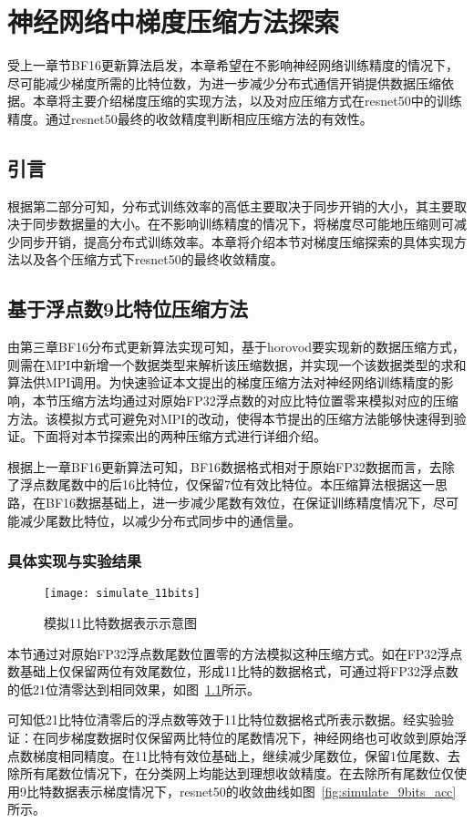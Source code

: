 \chapter{神经网络中梯度压缩方法探索}
受上一章节BF16更新算法启发，本章希望在不影响神经网络训练精度的情况下，尽可能减少梯度所需的比特位数，为进一步减少分布式通信开销提供数据压缩依据。本章将主要介绍梯度压缩的实现方法，以及对应压缩方式在resnet50中的训练精度。通过resnet50最终的收敛精度判断相应压缩方法的有效性。
\section{引言}
根据第二部分可知，分布式训练效率的高低主要取决于同步开销的大小，其主要取决于同步数据量的大小。在不影响训练精度的情况下，将梯度尽可能地压缩则可减少同步开销，提高分布式训练效率。本章将介绍本节对梯度压缩探索的具体实现方法以及各个压缩方式下resnet50的最终收敛精度。
\section{基于浮点数9比特位压缩方法}
由第三章BF16分布式更新算法实现可知，基于horovod要实现新的数据压缩方式，则需在MPI中新增一个数据类型来解析该压缩数据，并实现一个该数据类型的求和算法供MPI调用。为快速验证本文提出的梯度压缩方法对神经网络训练精度的影响，本节压缩方法均通过对原始FP32浮点数的对应比特位置零来模拟对应的压缩方法。该模拟方式可避免对MPI的改动，使得本节提出的压缩方法能够快速得到验证。下面将对本节探索出的两种压缩方式进行详细介绍。

根据上一章BF16更新算法可知，BF16数据格式相对于原始FP32数据而言，去除了浮点数尾数中的后16比特位，仅保留7位有效比特位。本压缩算法根据这一思路，在BF16数据基础上，进一步减少尾数有效位，在保证训练精度情况下，尽可能减少尾数比特位，以减少分布式同步中的通信量。

\subsection{具体实现与实验结果}
\begin{figure}[htp]
\centering
\texttt{[image: simulate\_11bits]}
\caption{模拟11比特数据表示示意图}
\label{fig:simulate_11bits}
\end{figure}
本节通过对原始FP32浮点数尾数位置零的方法模拟这种压缩方式。如在FP32浮点数基础上仅保留两位有效尾数位，形成11比特的数据格式，可通过将FP32浮点数的低21位清零达到相同效果，如图~\ref{fig:simulate_11bits}所示。

可知低21比特位清零后的浮点数等效于11比特位数据格式所表示数据。经实验验证：在同步梯度数据时仅保留两比特位的尾数情况下，神经网络也可收敛到原始浮点数梯度相同精度。在11比特有效位基础上，继续减少尾数位，保留1位尾数、去除所有尾数位情况下，在分类网上均能达到理想收敛精度。在去除所有尾数位仅使用9比特数据表示梯度情况下，resnet50的收敛曲线如图~\ref{fig:simulate_9bits_acc}所示。

